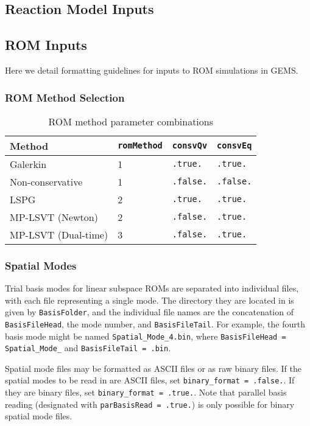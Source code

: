 \subsection{Reaction Model Inputs}

\subsection{ROM Inputs}

Here we detail formatting guidelines for inputs to ROM simulations in GEMS.  

\subsubsection{ROM Method Selection}

\begin{table}[H]
    \centering
    \begin{tabular}{llll}
        \toprule
        Method & \verb|romMethod| & \verb|consvQv| & \verb|consvEq| \\
        \midrule
        Galerkin & 1 & \verb|.true.| & \verb|.true.| \\
		Non-conservative & 1 & \verb|.false.| & \verb|.false.| \\
		LSPG & 2 & \verb|.true.| & \verb|.true.| \\
		MP-LSVT (Newton) & 2 & \verb|.false.| & \verb|.true.| \\
		MP-LSVT (Dual-time) & 3 & \verb|.false.| & \verb|.true.| \\
		
        \bottomrule 
    \end{tabular}
    \caption{ROM method parameter combinations}
\end{table}

\subsubsection{Spatial Modes}

Trial basis modes for linear subspace ROMs are separated into individual files, with each file representing a single mode. The directory they are located in is given by \verb|BasisFolder|, and the individual file names are the concatenation of \verb|BasisFileHead|, the mode number, and \verb|BasisFileTail|. For example, the fourth basis mode might be named \verb|Spatial_Mode_4.bin|, where \verb|BasisFileHead = Spatial_Mode_| and \verb|BasisFileTail = .bin|.

Spatial mode files may be formatted as ASCII files or as raw binary files. If the spatial modes to be read in are ASCII files, set \verb|binary_format = .false.|. If they are binary files, set \verb|binary_format = .true.|. Note that parallel basis reading (designated with \verb|parBasisRead = .true.|) is only possible for binary spatial mode files.

